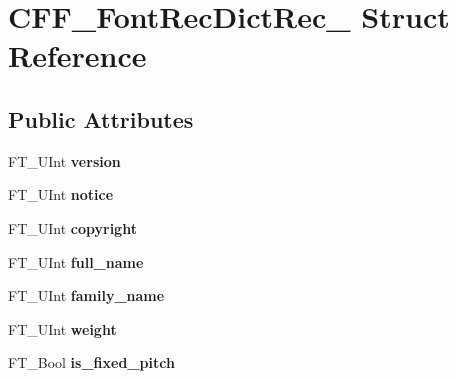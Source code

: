 \hypertarget{struct_c_f_f___font_rec_dict_rec__}{}\section{C\+F\+F\+\_\+\+Font\+Rec\+Dict\+Rec\+\_\+ Struct Reference}
\label{struct_c_f_f___font_rec_dict_rec__}
\subsection*{Public Attributes}
\begin{DoxyCompactItemize}
\item 
\mbox{\label{struct_c_f_f___font_rec_dict_rec___acf57a6671e52667f2ca56be173d2fbc4}} 
F\+T\+\_\+\+U\+Int {\bfseries version}
\item 
\mbox{\label{struct_c_f_f___font_rec_dict_rec___aa5ddff24415d30875ca78e6628454edf}} 
F\+T\+\_\+\+U\+Int {\bfseries notice}
\item 
\mbox{\label{struct_c_f_f___font_rec_dict_rec___ad3b74ad094c4c3ab46e44f1c8674cb53}} 
F\+T\+\_\+\+U\+Int {\bfseries copyright}
\item 
\mbox{\label{struct_c_f_f___font_rec_dict_rec___a2d2eb2abfb02cb68f84f6892607ae4a6}} 
F\+T\+\_\+\+U\+Int {\bfseries full\+\_\+name}
\item 
\mbox{\label{struct_c_f_f___font_rec_dict_rec___a19915c7a7236a7e90fe63a26dee1d12d}} 
F\+T\+\_\+\+U\+Int {\bfseries family\+\_\+name}
\item 
\mbox{\label{struct_c_f_f___font_rec_dict_rec___a845a6eff94bd01b6abef438bd1442d39}} 
F\+T\+\_\+\+U\+Int {\bfseries weight}
\item 
\mbox{\label{struct_c_f_f___font_rec_dict_rec___a73745a8bc80929918c0472127203e837}} 
F\+T\+\_\+\+Bool {\bfseries is\+\_\+fixed\+\_\+pitch}
\item 
\mbox{\label{struct_c_f_f___font_rec_dict_rec___afe7d2c26f6342e4c5b0117cf89075b68}} 

\end{DoxyCompactItemize}
